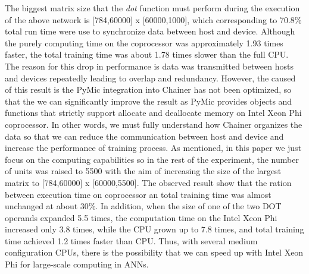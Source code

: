The biggest matrix size that the \textit{dot} function must perform during the execution of the above network is [784,60000] x [60000,1000], which corresponding to 70.8\% total run time were use to synchronize data between host and device. Although the purely  computing time on the coprocessor was approximately 1.93 times faster, the total training time was about 1.78 times slower than the full CPU. The reason for this drop in performance is data was transmitted between hosts and devices repeatedly leading to overlap and redundancy. However, the caused of this result is the PyMic integration into Chainer has not been optimized, so that the we can significantly improve the result as PyMic provides objects and functions that strictly support allocate and deallocate memory on Intel Xeon Phi coprocessor. In other words, we must fully understand how Chainer organizes the data so that we can reduce the communication between host and device and increase the performance of training process. As mentioned, in this paper we just focus on the computing capabilities so in the rest of the experiment, the number of units was raised to 5500 with the aim of increasing the size of the largest matrix to [784,60000] x [60000,5500]. The observed result show that the ration between execution time on coprocessor an total training time was almost unchanged at about 30\%. In addition, when the size of one of the two DOT operands expanded 5.5 times, the computation time on the Intel Xeon Phi increased only 3.8 times, while the CPU grown up to 7.8 times, and total training time achieved 1.2 times faster than CPU. Thus, with several medium configuration CPUs, there is the possibility that we can speed up with Intel Xeon Phi for large-scale computing in ANNs.
